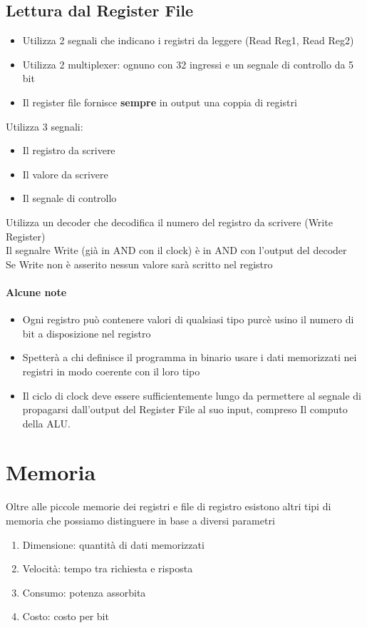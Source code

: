 \documentclass[12pt, a4paper, openany]{book}
\begin{document}
\subsection*{Lettura dal Register File}
\begin{itemize}
    \item Utilizza 2 segnali che indicano i registri da leggere (Read Reg1, Read Reg2)
    \item Utilizza 2 multiplexer: ognuno con 32 ingressi e un segnale di controllo da 5 bit
    \item Il register file fornisce \textbf{sempre} in output una coppia di registri
\end{itemize}
Utilizza 3 segnali: \begin{itemize}
    \item Il registro da scrivere
    \item Il valore da scrivere
    \item Il segnale di controllo
\end{itemize}
Utilizza un decoder che decodifica il numero del registro da scrivere (Write Register)
\\ Il segnalre Write (già in AND con il clock) è in AND con l'output del decoder
\\ Se Write non è asserito nessun valore sarà scritto nel registro
\paragraph*{Alcune note}
\begin{itemize}
    \item Ogni registro può contenere valori di qualsiasi tipo purcè usino il numero
    di bit a disposizione nel registro
    \item Spetterà a chi definisce il programma in binario usare i dati
    memorizzati nei registri in modo coerente con il loro tipo
    \item Il ciclo di clock deve essere sufficientemente lungo da permettere
    al segnale di propagarsi dall'output del Register File al suo input, compreso Il
    computo della ALU.
\end{itemize}
\section{Memoria}
Oltre alle piccole memorie dei registri e file di registro esistono altri tipi di
memoria che possiamo distinguere in base a diversi parametri
\begin{enumerate}
    \item Dimensione: quantità di dati memorizzati
    \item Velocità: tempo tra richiesta e risposta
    \item Consumo: potenza assorbita
    \item Costo: costo per bit
\end{enumerate}
\end{document}
